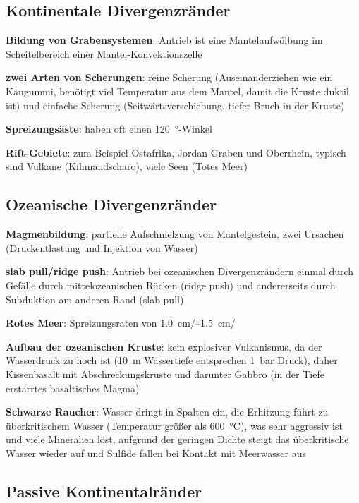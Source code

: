\subsection{%
    Kontinentale Divergenzränder%
}

\textbf{Bildung von Grabensystemen}:
Antrieb ist eine Mantelaufwölbung im Scheitelbereich einer Mantel-Konvektionszelle

\textbf{zwei Arten von Scherungen}:
reine Scherung (Auseinanderziehen wie ein Kaugummi, benötigt viel Temperatur aus dem Mantel,
damit die Kruste duktil ist) und
einfache Scherung (Seitwärtsverschiebung, tiefer Bruch in der Kruste)

\textbf{Spreizungsäste}:
haben oft einen \SI{120}{\degree}-Winkel

\textbf{Rift-Gebiete}:
zum Beispiel Ostafrika, Jordan-Graben und Oberrhein,
typisch sind Vulkane (Kilimandscharo), viele Seen (Totes Meer)

\pagebreak

\subsection{%
    Ozeanische Divergenzränder%
}

\textbf{Magmenbildung}:
partielle Aufschmelzung von Mantelgestein,
zwei Ursachen (Druckentlastung und Injektion von Wasser)

\textbf{slab pull/ridge push}:
Antrieb bei ozeanischen Divergenzrändern einmal durch
Gefälle durch mittelozeanischen Rücken (ridge push) und andererseits durch
Subduktion am anderen Rand (slab pull)

\textbf{Rotes Meer}:
Spreizungsraten von \SIrange{1.0}{1.5}{\centi\meter/\year}

\textbf{Aufbau der ozeanischen Kruste}:
kein explosiver Vulkanismus, da der Wasserdruck zu hoch ist
(\SI{10}{\meter} Wassertiefe entsprechen \SI{1}{\bar} Druck),
daher Kissenbasalt mit Abschreckungskruste
und darunter Gabbro (in der Tiefe erstarrtes basaltisches Magma)

\textbf{Schwarze Raucher}:
Wasser dringt in Spalten ein,
die Erhitzung führt zu überkritischem Wasser (Temperatur größer als \SI{600}{\celsius}),
was sehr aggressiv ist und viele Mineralien löst,
aufgrund der geringen Dichte steigt das überkritische Wasser wieder auf und
Sulfide fallen bei Kontakt mit Meerwasser aus

\subsection{%
    Passive Kontinentalränder%
}

